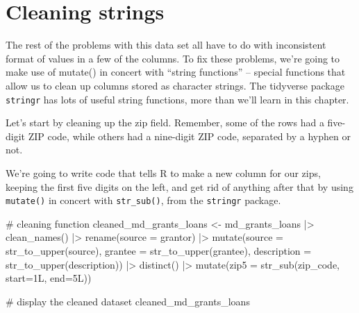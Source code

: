 \documentclass[
  letterpaper,
  DIV=11,
  numbers=noendperiod]{scrreprt}
\newenvironment{Shaded}{\begin{snugshade}}{\end{snugshade}}
\newcommand{\AttributeTok}[1]{\textcolor[rgb]{0.40,0.45,0.13}{#1}}
\newcommand{\CommentTok}[1]{\textcolor[rgb]{0.37,0.37,0.37}{#1}}
\newcommand{\FunctionTok}[1]{\textcolor[rgb]{0.28,0.35,0.67}{#1}}
\newcommand{\NormalTok}[1]{\textcolor[rgb]{0.00,0.23,0.31}{#1}}
\newcommand{\OtherTok}[1]{\textcolor[rgb]{0.00,0.23,0.31}{#1}}
\newcommand{\SpecialCharTok}[1]{\textcolor[rgb]{0.37,0.37,0.37}{#1}}
\begin{document}
\hypertarget{cleaning-strings}{%
\section{Cleaning strings}\label{cleaning-strings}}

The rest of the problems with this data set all have to do with
inconsistent format of values in a few of the columns. To fix these
problems, we're going to make use of mutate() in concert with ``string
functions'' -- special functions that allow us to clean up columns
stored as character strings. The tidyverse package \texttt{stringr} has
lots of useful string functions, more than we'll learn in this chapter.

Let's start by cleaning up the zip field. Remember, some of the rows had
a five-digit ZIP code, while others had a nine-digit ZIP code, separated
by a hyphen or not.

We're going to write code that tells R to make a new column for our
zips, keeping the first five digits on the left, and get rid of anything
after that by using \texttt{mutate()} in concert with
\texttt{str\_sub()}, from the \texttt{stringr} package.

\begin{Shaded}
\begin{Highlighting}[]
\CommentTok{\# cleaning function}
\NormalTok{cleaned\_md\_grants\_loans }\OtherTok{\textless{}{-}}\NormalTok{ md\_grants\_loans }\SpecialCharTok{|\textgreater{}}
  \FunctionTok{clean\_names}\NormalTok{() }\SpecialCharTok{|\textgreater{}} 
  \FunctionTok{rename}\NormalTok{(}\AttributeTok{source =}\NormalTok{ grantor) }\SpecialCharTok{|\textgreater{}} 
  \FunctionTok{mutate}\NormalTok{(}\AttributeTok{source =} \FunctionTok{str\_to\_upper}\NormalTok{(source), }\AttributeTok{grantee =} \FunctionTok{str\_to\_upper}\NormalTok{(grantee), }\AttributeTok{description =} \FunctionTok{str\_to\_upper}\NormalTok{(description)) }\SpecialCharTok{|\textgreater{}} 
  \FunctionTok{distinct}\NormalTok{() }\SpecialCharTok{|\textgreater{}}
  \FunctionTok{mutate}\NormalTok{(}\AttributeTok{zip5 =} \FunctionTok{str\_sub}\NormalTok{(zip\_code, }\AttributeTok{start=}\NormalTok{1L, }\AttributeTok{end=}\NormalTok{5L))}


\CommentTok{\# display the cleaned dataset}
\NormalTok{cleaned\_md\_grants\_loans}
\end{Highlighting}
\end{Shaded}
\end{document}
